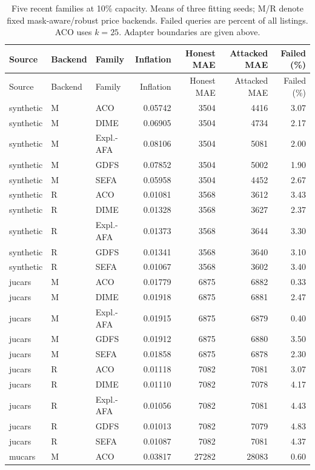 \begin{longtable}{lllrrrr}
\caption{Five recent families at 10\% capacity. Means of three fitting seeds;
M/R denote fixed mask-aware/robust price backends. Failed queries are percent
of all listings. ACO uses $k=25$. Adapter boundaries are given above.}\label{tab:recent_primary}\\
\toprule Source & Backend & Family & Inflation & Honest MAE & Attacked MAE & Failed (\%)\\\midrule\endfirsthead
\toprule Source & Backend & Family & Inflation & Honest MAE & Attacked MAE & Failed (\%)\\\midrule\endhead
synthetic & M & ACO & 0.05742 & 3504 & 4416 & 3.07 \\
synthetic & M & DIME & 0.06905 & 3504 & 4734 & 2.17 \\
synthetic & M & Expl.-AFA & 0.08106 & 3504 & 5081 & 2.00 \\
synthetic & M & GDFS & 0.07852 & 3504 & 5002 & 1.90 \\
synthetic & M & SEFA & 0.05958 & 3504 & 4452 & 2.67 \\
synthetic & R & ACO & 0.01081 & 3568 & 3612 & 3.43 \\
synthetic & R & DIME & 0.01328 & 3568 & 3627 & 2.37 \\
synthetic & R & Expl.-AFA & 0.01373 & 3568 & 3644 & 3.30 \\
synthetic & R & GDFS & 0.01341 & 3568 & 3640 & 3.10 \\
synthetic & R & SEFA & 0.01067 & 3568 & 3602 & 3.40 \\
jucars & M & ACO & 0.01779 & 6875 & 6882 & 0.33 \\
jucars & M & DIME & 0.01918 & 6875 & 6881 & 2.47 \\
jucars & M & Expl.-AFA & 0.01915 & 6875 & 6879 & 0.40 \\
jucars & M & GDFS & 0.01912 & 6875 & 6880 & 3.50 \\
jucars & M & SEFA & 0.01858 & 6875 & 6878 & 2.30 \\
jucars & R & ACO & 0.01118 & 7082 & 7081 & 3.07 \\
jucars & R & DIME & 0.01110 & 7082 & 7078 & 4.17 \\
jucars & R & Expl.-AFA & 0.01056 & 7082 & 7081 & 4.43 \\
jucars & R & GDFS & 0.01013 & 7082 & 7079 & 4.83 \\
jucars & R & SEFA & 0.01087 & 7082 & 7081 & 4.37 \\
mucars & M & ACO & 0.03817 & 27282 & 28083 & 0.60 \\

\end{longtable}

